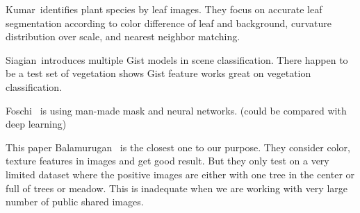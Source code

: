 

Kumar\etal~\cite{kumar2012leafsnap}identifies plant species by leaf images. They focus on accurate leaf segmentation according to color difference of leaf and background, curvature distribution over scale, and nearest neighbor matching.


Siagian\etal~\cite{siagian2008comparison}introduces multiple Gist models in scene classification. There happen to be a test set of vegetation shows Gist feature works great on vegetation classification.


Foschi\etal~\cite{foschi1997detecting} is using man-made mask and neural networks.
(could be compared with deep learning)


This paper Balamurugan\etal~\cite{balamurugan2007greenery}
is the closest one to our purpose.
They consider
color, texture features in images and get good result. But they only test on a very limited dataset where the positive images are either with one tree in the center or full of trees or meadow. This is inadequate when we are working with   very large number of public shared images.


